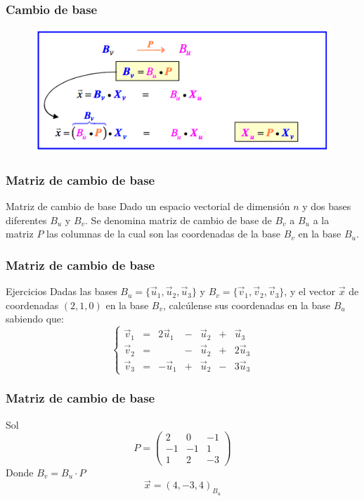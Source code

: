\documentclass{beamer}
\begin{document}
 \begin{frame}
  \frametitle{Cambio de base}

\begin{figure}[h]
  \label{fig:esquema}
\centering
\includegraphics[width=\textwidth]{esquema}
\end{figure}
\end{frame}



 \begin{frame}
  \frametitle{Matriz de cambio de base}
\begin{block}{Matriz de cambio de base}
Dado un espacio vectorial de dimensi\'on $n$ y dos bases diferentes $B_u$ y $B_v$. Se denomina matriz de cambio de base de $B_v$ a $B_u$ a la matriz $P$ las columnas de la cual son las coordenadas de la base $B_v$ en la base $B_u$.
\end{block}
\end{frame}

 \begin{frame}
  \frametitle{Matriz de cambio de base}
\begin{block}{Ejercicios}
Dadas las bases $B_u = \{\vec u_1, \vec u_2, \vec u_3\}$ y $B_v = \{\vec v_1,\vec v_2,\vec v_3\}$, y el vector $\vec x$ de coordenadas $(2,1,0)$ en la base $B_v$, calc\'ulense sus coordenadas en la base $B_u$ sabiendo que:
\[\left\{\begin{array}{ccccccc}\vec v_1 & = & 2\vec u_1 & - & \vec u_2 & + & \vec u_3 \\\vec v_2 & = &  & - & \vec u_2 & + & 2\vec u_3 \\\vec v_3 & = & -\vec u_1 & + & \vec u_2 & - & 3\vec u_3\end{array}\right.\]
 \end{block}
\end{frame}

\begin{frame}
  \frametitle{Matriz de cambio de base}
Sol
\[P = \left(\begin{array}{ccc}
2&0&-1\\
-1&-1&1\\
1&2&-3
\end{array}\right)\]
Donde $B_v = B_u\cdot P$
\[\vec x = (4,-3,4)_{B_u}\]
\end{frame}
\end{document}
